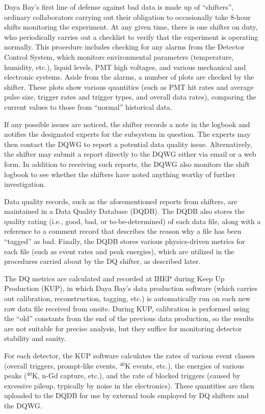 \documentclass[../thesis.tex]{subfiles}
\begin{document}
Daya Bay's first line of defense against bad data is made up of ``shifters'',
ordinary collaborators carrying out their obligation to occasionally take 8-hour
shifts monitoring the experiment. At any given time, there is one shifter on
duty, who periodically carries out a checklist to verify that the experiment is
operating normally. This procedure includes checking for any alarms from the
Detector Control System, which monitors environmental parameters (temperature,
humidity, etc.), liquid levels, PMT high voltages, and various mechanical and
electronic systems. Aside from the alarms, a number of plots are checked by the
shifter. These plots show various quantities (such as PMT hit rates and average
pulse size, trigger rates and trigger types, and overall data rates), comparing
the current values to those from ``normal'' historical data.

If any possible issues are noticed, the shifter records a note in the logbook
and notifies the designated experts for the subsystem in question. The experts
may then contact the DQWG to report a potential data quality
issue. Alternatively, the shifter may submit a report directly to the DQWG
either via email or a web form. In addition to receiving such reports, the DQWG
also monitors the shift logbook to see whether the shifters have noted anything
worthy of further investigation.

Data quality records, such as the aforementioned reports from shifters, are
maintained in a Data Quality Database (DQDB). The DQDB also stores the quality
rating (i.e., good, bad, or to-be-determined) of each data file, along with a
reference to a comment record that describes the reason why a file has been
``tagged'' as bad. Finally, the DQDB stores various physics-driven metrics for
each file (such as event rates and peak energies), which are utilized in the
procedures carried about by the DQ shifter, as described later.

The DQ metrics are calculated and recorded at IHEP during Keep Up Production
(KUP), in which Daya Bay's data production software (which carries out
calibration, reconstruction, tagging, etc.) is automatically run on each new raw
data file received from onsite. During KUP, calibration is performed using the
``old'' constants from the end of the previous data production, so the results
are not suitable for precise analysis, but they suffice for monitoring detector
stability and sanity.

For each detector, the KUP software calculates the rates of various event
classes (overall triggers, prompt-like events, $^{40}$K events, etc.), the
energies of various peaks ($^{40}$K, n-Gd capture, etc.), and the rate of
blocked triggers (caused by excessive pileup, typically by noise in the
electronics). These quantities are then uploaded to the DQDB for use by external
tools employed by DQ shifters and the DQWG.
\end{document}
